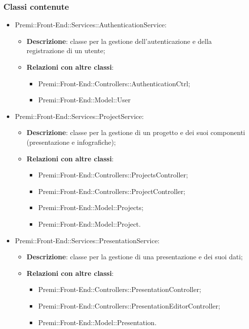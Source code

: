 \subsubsection*{Classi contenute}
\begin{itemize}

    \item Premi::Front-End::Services::AuthenticationService:
	\begin{itemize}
		\item \textbf{Descrizione}: classe per la gestione dell'autenticazione e della registrazione di un utente;
		\item \textbf{Relazioni con altre classi}:
		\begin{itemize}
			\item Premi::Front-End::Controllers::AuthenticationCtrl;
			\item Premi::Front-End::Model::User
		\end{itemize}
	\end{itemize}

    \item Premi::Front-End::Services::ProjectService:
	\begin{itemize}
		\item \textbf{Descrizione}: classe per la gestione di un progetto e dei suoi componenti (presentazione e infografiche);
		\item \textbf{Relazioni con altre classi}:
		\begin{itemize}
			\item Premi::Front-End::Controllers::ProjectsController;
			\item Premi::Front-End::Controllers::ProjectController;
			\item Premi::Front-End::Model::Projects;
			\item Premi::Front-End::Model::Project.
		\end{itemize}
	\end{itemize}

    \item Premi::Front-End::Services::PresentationService:
	\begin{itemize}
		\item \textbf{Descrizione}: classe per la gestione di una presentazione e dei suoi dati;
		\item \textbf{Relazioni con altre classi}:
		\begin{itemize}
			\item Premi::Front-End::Controllers::PresentationController;
			\item Premi::Front-End::Controllers::PresentationEditorController;
			\item Premi::Front-End::Model::Presentation.
		\end{itemize}
	\end{itemize}


\end{itemize}

